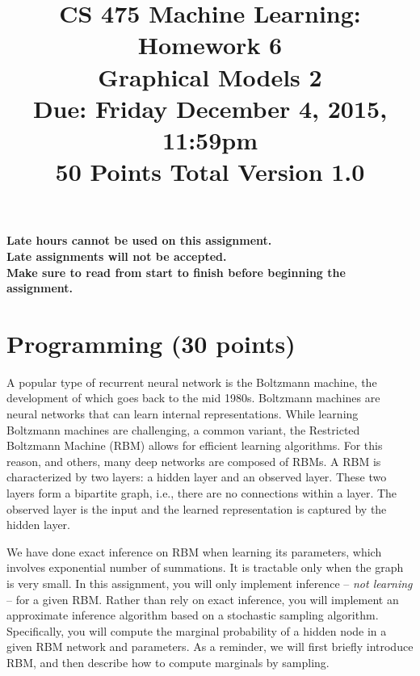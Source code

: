 \documentclass[11pt]{article}
\title{CS 475 Machine Learning: Homework 6\\Graphical Models 2\\
\Large{Due: Friday December 4, 2015, 11:59pm}\\
50 Points Total \hspace{1cm} Version 1.0}
\author{}
\date{}
\begin{document}
\large
\maketitle
\thispagestyle{headings}

\vspace{-.5in}

{\bf Late hours cannot be used on this assignment.}\\
{\bf Late assignments will not be accepted.}
\\
{\bf Make sure to read from start to finish before beginning the assignment.}
\section{Programming (30 points)}
A popular type of recurrent neural network is the Boltzmann machine, the development of which goes back to the mid 1980s. Boltzmann machines
are neural networks that can learn internal representations. While learning Boltzmann machines are challenging, a common variant, the Restricted Boltzmann
Machine (RBM) allows for efficient learning algorithms. For this reason, and others, many deep networks are composed of RBMs.
A RBM is characterized by two layers: a hidden layer and an observed layer. These two layers form a bipartite graph, i.e., there are no connections within a layer.
The observed layer is the input and the learned representation is captured by the hidden layer.

We have done exact inference on RBM when learning its parameters, which involves exponential number of summations. It is tractable only when the graph is very small. In this assignment, you will only implement inference -- {\em not learning} -- for a given RBM. Rather than rely on exact inference, you will implement an approximate inference algorithm based on a stochastic sampling algorithm. Specifically, you will compute the marginal probability of a hidden node in a given RBM network and parameters. As a reminder, we will first briefly introduce RBM, and then describe how to compute marginals by sampling.
\end{document}
